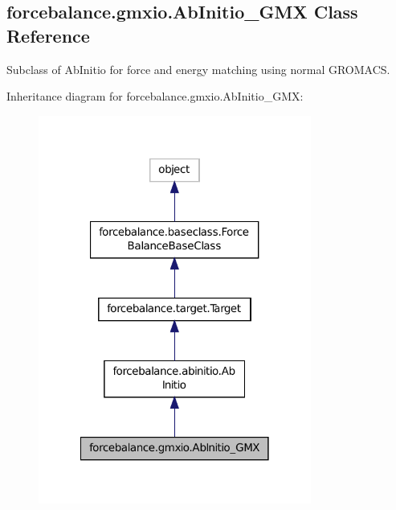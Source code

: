 \hypertarget{classforcebalance_1_1gmxio_1_1AbInitio__GMX}{\subsection{forcebalance.\-gmxio.\-Ab\-Initio\-\_\-\-G\-M\-X Class Reference}
\label{classforcebalance_1_1gmxio_1_1AbInitio__GMX}
}


Subclass of Ab\-Initio for force and energy matching using normal G\-R\-O\-M\-A\-C\-S.  




Inheritance diagram for forcebalance.\-gmxio.\-Ab\-Initio\-\_\-\-G\-M\-X\-:\nopagebreak
\begin{figure}[H]
\begin{center}
\leavevmode
\includegraphics[width=254pt]{classforcebalance_1_1gmxio_1_1AbInitio__GMX__inherit__graph}
\end{center}
\end{figure}



